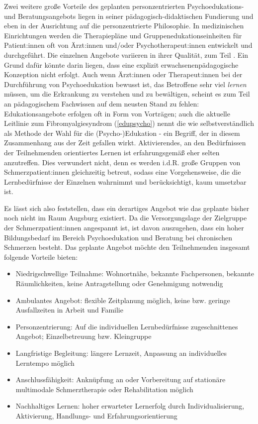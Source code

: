 \documentclass[
  twoside,
  parskip=half-,
  paper=176mm:246mm,
  BCOR=14mm,
  DIV=14,
]{scrreprt}
\begin{document}
Zwei weitere große Vorteile des geplanten personzentrierten Psychoedukations- und Beratungsangebots liegen in seiner pädagogisch-didaktischen Fundierung und eben in der Ausrichtung auf die personzentrierte Philosophie. In medizinischen Einrichtungen werden die Therapiepläne und Gruppenedukationseinheiten für Patient:innen oft von Ärzt:innen und/oder Psychotherapeut:innen entwickelt und durchgeführt. Die einzelnen Angebote variieren in ihrer Qualität, zum Teil . Ein Grund dafür könnte darin liegen, dass eine explizit erwachsenenpädagogische Konzeption nicht erfolgt. Auch wenn Ärzt:innen oder Therapeut:innen bei der Durchführung von Psychoedukation bewusst ist, das Betroffene sehr viel \textit{lernen} müssen, um die Erkrankung zu verstehen und zu bewältigen, scheint es zum Teil an pädagogischem Fachwissen auf dem neusten Stand zu fehlen: Edukationsangebote erfolgen oft in Form von Vorträgen; auch die aktuelle Leitlinie zum Fibromyalgiesyndrom (\autoref{edupsycho}) nennt die  wie selbstverständlich als Methode der Wahl für die (Psycho-)Edukation - ein Begriff, der in diesem Zusammenhang aus der Zeit gefallen wirkt. Aktivierendes, an den Bedürfnissen der Teilnehmenden orientiertes Lernen ist erfahrungsgemäß eher selten anzutreffen. Dies verwundert nicht, denn es werden i.d.R. große Gruppen von Schmerzpatient:innen gleichzeitig betreut, sodass eine Vorgehensweise, die die Lernbedürfnisse der Einzelnen wahrnimmt und berücksichtigt, kaum umsetzbar ist.

Es lässt sich also feststellen, dass ein derartiges Angebot wie das geplante bisher noch nicht im Raum Augsburg existiert. Da die Versorgungslage der Zielgruppe der Schmerzpatient:innen angespannt ist, ist davon auszugehen, dass ein hoher Bildungsbedarf im Bereich Psychoedukation und Beratung bei chronischen Schmerzen besteht. Das geplante Angebot möchte den Teilnehmenden insgesamt folgende Vorteile bieten:
\begin{itemize}
  \item Niedrigschwellige Teilnahme: Wohnortnähe, bekannte Fachpersonen, bekannte Räumlichkeiten, keine Antragstellung oder Genehmigung notwendig
  \item Ambulantes Angebot: flexible Zeitplanung möglich, keine bzw. geringe Ausfallzeiten in Arbeit und Familie
  \item Personzentrierung: Auf die individuellen Lernbedürfnisse zugeschnittenes Angebot; Einzelbetreuung bzw. Kleingruppe
  \item Langfristige Begleitung: längere Lernzeit, Anpassung an individuelles Lerntempo möglich
  \item Anschlussfähigkeit: Anknüpfung an oder Vorbereitung auf stationäre multimodale Schmerztherapie oder Rehabilitation möglich
  \item Nachhaltiges Lernen: hoher erwarteter Lernerfolg durch Individualisierung, Aktivierung, Handlungs- und Erfahrungsorientierung
\end{itemize}
\end{document}
